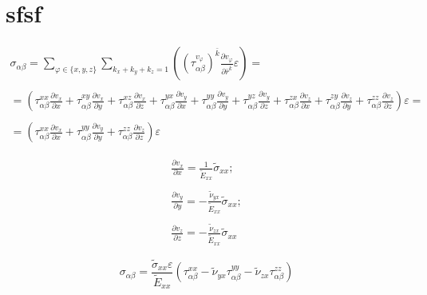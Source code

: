 \documentclass[a4paper,12pt]{article}
\begin{document}
\section[c]{sfsf}

\begin{equation}
    \begin{array}{c}
        {\sigma_{\alpha\beta}} = \sum\limits_{\varphi \in \{x,y,z\}}
        \sum\limits_{k_x+k_y+k_z=1}\left( 
        \left(\tau_{\alpha\beta}^{v_{\varphi}}\right)^{\bar{k}}
        \frac{\partial v_{\varphi}}{\partial \bar{r}^{\bar{k}}}
    \varepsilon \right) = \\ \\
    = \left(\tau_{\alpha\beta}^{xx} \frac{\partial v_{x}}{\partial x} +
    \tau_{\alpha\beta}^{xy} \frac{\partial v_{x}}{\partial y} +
    \tau_{\alpha\beta}^{xz} \frac{\partial v_{x}}{\partial z} +
    \tau_{\alpha\beta}^{yx} \frac{\partial v_{y}}{\partial x} +
    \tau_{\alpha\beta}^{yy} \frac{\partial v_{y}}{\partial y} +
    \tau_{\alpha\beta}^{yz} \frac{\partial v_{y}}{\partial z} +
    \tau_{\alpha\beta}^{zx} \frac{\partial v_{z}}{\partial x} +
    \tau_{\alpha\beta}^{zy} \frac{\partial v_{z}}{\partial y} +
    \tau_{\alpha\beta}^{zz} \frac{\partial v_{z}}{\partial z}\right)\varepsilon = \\ \\
    = \left(\tau_{\alpha\beta}^{xx} \frac{\partial v_{x}}{\partial x} +
    \tau_{\alpha\beta}^{yy} \frac{\partial v_{y}}{\partial y} +
    \tau_{\alpha\beta}^{zz} \frac{\partial v_{z}}{\partial z}\right)\varepsilon 
    \end{array} 
\end{equation} 

\begin{equation}
    \begin{array}{c}
        \frac{\partial v_{x}}{\partial x} =
        \frac{1}{\widetilde{E}_{xx}}\widetilde{\sigma}_{xx}; \\ \\
        \frac{\partial v_{y}}{\partial y} = -
        \frac{\widetilde{\nu}_{yx}}{\widetilde{E}_{xx}}\widetilde{\sigma}_{xx}; \\ \\
        \frac{\partial v_{z}}{\partial z} = -
        \frac{\widetilde{\nu}_{zx}}{\widetilde{E}_{xx}}\widetilde{\sigma}_{xx}
    \end{array} 
\end{equation} 

\begin{equation}
    {\sigma_{\alpha\beta}} = \frac{\widetilde{\sigma}_{xx}\varepsilon}{\widetilde{E}_{xx}}
    \left(\tau_{\alpha\beta}^{xx} -
    \widetilde{\nu}_{yx} \tau_{\alpha\beta}^{yy} -
    \widetilde{\nu}_{zx} \tau_{\alpha\beta}^{zz}\right)
\end{equation} 
\end{document}
